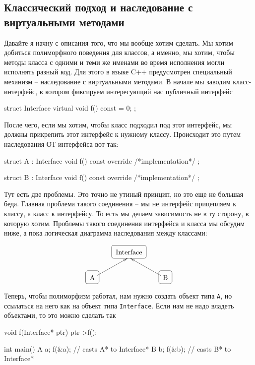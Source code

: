 \subsection{Классический подход и наследование с виртуальными методами}
\label{section::ClassicPolymorphism}

Давайте я начну с описания того, что мы вообще хотим сделать.
Мы хотим добиться полиморфного поведения для классов, а именно, мы хотим, чтобы методы класса с одними и теми же именами во время исполнения могли исполнять разный код.
Для этого в языке C++ предусмотрен специальный механизм -- наследование с виртуальными методами.
В начале мы заводим класс-интерфейс, в котором фиксируем интересующий нас публичный интерфейс
\begin{cppcode}
struct Interface {
  virtual void f() const = 0;
};
\end{cppcode}
После чего, если мы хотим, чтобы класс подходил под этот интерфейс, мы должны прикрепить этот интерфейс к нужному классу.
Происходит это путем наследования ОТ интерфейса вот так:
\begin{cppcode}
struct A : Interface {
  void f() const override { /*implementation*/ }
};

struct B : Interface {
  void f() const override { /*implementation*/ }
};
\end{cppcode}
Тут есть две проблемы.
Это точно не утиный принцип, но это еще не большая беда.
Главная проблема такого соединения -- мы не интерфейс прицепляем к классу, а класс к интерфейсу.
То есть мы делаем зависимость не в ту сторону, в которую хотим.
Проблемы такого соединения интерфейса и класса мы обсудим ниже, а пока логическая диаграмма наследования между классами:
\begin{center}
\[
\xymatrix{
  {}&{\text{Interface}}
   	{\save
   [].[]*+[F-:<3pt>]\frm{}
   \restore
	}
  &{}\\
  {\text{A}}\ar[ur]+(-1, -3)
 	{\save
   [].[]*+[F-:<3pt>]\frm{}
   \restore
	}
  &{}&{\text{B}}\ar[ul]+(1, -3)
   {	\save
   [].[]*+[F-:<3pt>]\frm{}
   \restore
	}
}
\]
\end{center}
Теперь, чтобы полиморфизм работал, нам нужно создать объект типа \texttt{A}, но ссылаться на него как на объект типа \texttt{Interface}.
Если нам не надо владеть объектами, то это можно сделать так
\begin{cppcode}
void f(Interface* ptr) {
  ptr->f();
}

int main() {
  A a;
  f(&a); // casts A* to Interface*
  B b;
  f(&b); // casts B* to Interface*
}
\end{cppcode}
